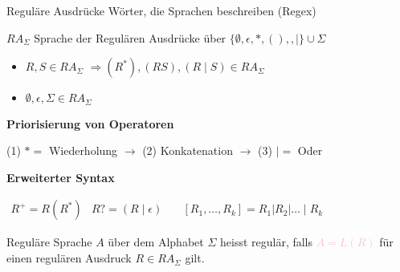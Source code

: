 \begin{definition}{Reguläre Ausdrücke}
    Wörter, die Sprachen beschreiben (Regex)
\end{definition}

\begin{concept}{$R A_{\Sigma}$}
    Sprache der Regulären Ausdrücke über $\{\emptyset, \epsilon, *,(),, \mid\} \cup \Sigma$ 
    
    \begin{minipage}{0.69\linewidth}
    \begin{itemize}
        \item $R, S \in R A_{\Sigma}$ $\Rightarrow(R^{*}), (R S), (R \mid S) \in R A_{\Sigma}$  
    \end{itemize}
    \end{minipage}
    \begin{minipage}{0.3\linewidth}
        \begin{itemize}
            \item $\emptyset, \epsilon, \Sigma \in R A_{\Sigma}$
        \end{itemize}
    \end{minipage}

    \vspace*{1mm}

    \textbf{Priorisierung von Operatoren}
    
    (1) $*=$ Wiederholung $\rightarrow$ (2) Konkatenation $\rightarrow$ (3) $\mid=$ Oder
    
    \textbf{Erweiterter Syntax}

        $
        \begin{array}{lcr}
            R^{+} = R (R^{*}) & R ?=(R \mid \epsilon) & \quad \left[R_{1}, \ldots, R_{k}\right]=R_{1}\left|R_{2}\right| \ldots \mid R_{k} 
        \end{array}
        $
\end{concept}



\begin{definition}{Reguläre Sprache}
    $A$ über dem Alphabet $\Sigma$ heisst regulär, falls \textcolor{pink}{$A=L(R)$} für einen regulären Ausdruck $R \in R A_{\Sigma}$ gilt.
\end{definition} 

